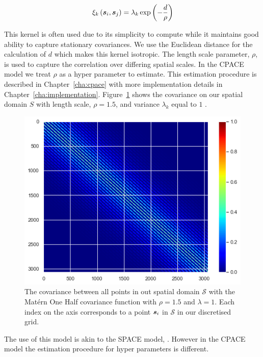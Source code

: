 \begin{equation}
	\xi_k\left(\bm{{s}}_{i}, \bm{{s}}_{j}\right) = \lambda_k \exp \left( -\frac{d}{\rho} \right)
\end{equation}

This kernel is often used due to its simplicity to compute while it maintains good ability to capture stationary covariances.
We use the Euclidean distance for the calculation of $d$ which makes this kernel isotropic.
The length scale parameter, $\rho$, is used to capture the correlation over differing spatial scales.
In the CPACE model we treat $\rho$ as a hyper parameter to estimate.
This estimation procedure is described in Chapter~\ref{cha:cpace} with more implementation details in Chapter~\ref{cha:implementation}.
Figure~\ref{fig:ex_mat_1} shows the covariance on our spatial domain $S$ with length scale, $\rho = 1.5$,  and variance $\lambda_k$ equal to $1$ .

\begin{figure}
	\centering
	\includegraphics[width=\textwidth]{ex_mat_1}
	\caption[An example Mat\'ern One Half covariance function evaluated between all points in the spatial grid.]{The covariance between all points in out spatial domain $\mathcal{S}$ with the Mat\'ern One Half covariance function with $\rho=1.5$ and $\lambda=1$. Each index on the axis corresponds to a point $\bm{{s}}_i$ in $\mathcal{S}$ in our discretised grid.}
	\label{fig:ex_mat_1}
\end{figure}

The use of this model is akin to the SPACE model, \citep{liu_functional_2017}.
However in the CPACE model the estimation procedure for hyper parameters is different.

